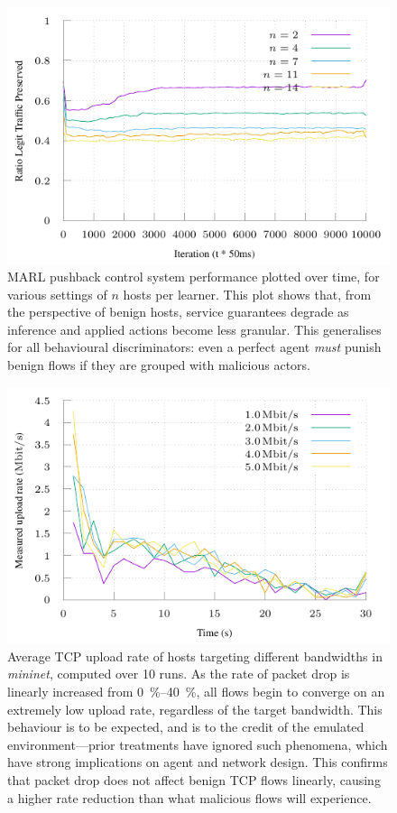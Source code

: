 \documentclass[conference, letterpaper, 10pt, times]{IEEEtran}
\begin{document}
\begin{figure}[ht]
	\includegraphics[width=\linewidth]{../plots/online-varyN-uneven}
	\caption{
		MARL pushback control system performance plotted over time, for various settings of $n$ hosts per learner.
		This plot shows that, from the perspective of benign hosts, service guarantees degrade as inference and applied actions become less granular.
		This generalises for all behavioural discriminators: even a perfect agent \emph{must} punish benign flows if they are grouped with malicious actors.
		\label{fig:marl-granularity}
	}
\end{figure}

\begin{figure}[ht]
	\includegraphics[width=\linewidth]{../plots/mplex}
	\caption{
		Average TCP upload rate of hosts targeting different bandwidths in \emph{mininet}, computed over 10 runs.
		As the rate of packet drop is linearly increased from \SIrange{0}{40}{\percent}, all flows begin to converge on an extremely low upload rate, regardless of the target bandwidth.
		This behaviour is to be expected, and is to the credit of the emulated environment---prior treatments have ignored such phenomena, which have strong implications on agent and network design.
		This confirms that packet drop does not affect benign TCP flows linearly, causing a higher rate reduction than what malicious flows will experience.
		\label{fig:mplex-tcp}
	}
\end{figure}
\end{document}
